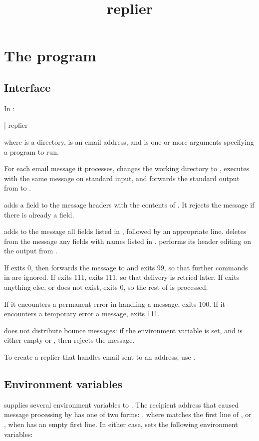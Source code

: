 \documentclass{book}
\title{replier}
\begin{document}
\section{The  program}

\subsection{Interface}
In :
\begin{code}%
  | replier   
\end{code}
where  is a directory,  is an email address,
and  is one or more arguments specifying a program to run.

For each email message it processes,  changes the working
directory to , executes  with the same message on
standard input, and forwards the standard output from  to
.

 adds a  field to the message
headers with the contents of .  It rejects the
message if there is already a  field.

 adds to the message all fields listed in
, followed by an appropriate
 line.   deletes from the message
any fields with names listed in .
 performs its header editing on the output from
.

If  exits 0, then  forwards the message to
 and exits 99, so that further commands in 
are ignored.  If  exits 111,  exits 111, so
that delivery is retried later.  If  exits anything else, or
does not exist,  exits 0, so the rest of
 is processed.

If it encounters a permanent error in handling a message,
 exits 100.  If it encounters a temporary error a
message,  exits 111.


 does not distribute bounce messages: if the environment
variable  is set, and is either empty or ,
then  rejects the message.

To create a replier that handles email sent to an address, use
.


\subsection{Environment variables}
 supplies several environment variables to .
The recipient address that caused message processing by 
has one of two forms: ,
where  matches the first line of
, or , when
 has an empty first line.  In either case,
 sets the following environment variables:
\end{document}
